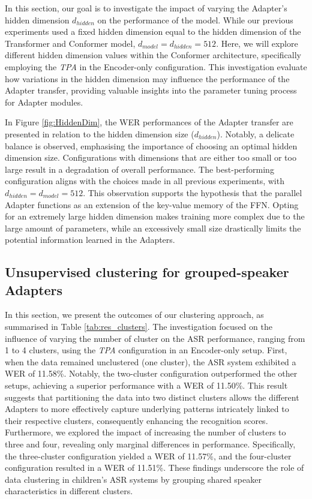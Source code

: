 In this section, our goal is to investigate the impact of varying the Adapter's hidden dimension $d_{hidden}$ on the performance of the model. While our previous experiments used a fixed hidden dimension equal to the hidden dimension of the Transformer and Conformer model, $d_{model} =  d_{hidden} = 512$. Here, we will explore different hidden dimension values within the Conformer architecture, specifically employing the \textit{\ac{TPA}} in the Encoder-only configuration. This investigation evaluate how variations in the hidden dimension may influence the performance of the Adapter transfer, providing valuable insights into the parameter tuning process for Adapter modules.

In Figure \ref{fig:HiddenDim}, the \ac{WER} performances of the Adapter transfer are presented in relation to the hidden dimension size ($d_{hidden}$). Notably, a delicate balance is observed, emphasising the importance of choosing an optimal hidden dimension size. Configurations with dimensions that are either too small or too large result in a degradation of overall performance. The best-performing configuration aligns with the choices made in all previous experiments, with $d_{hidden} = d_{model} = 512$. This observation supports the hypothesis that the parallel Adapter functions as an extension of the key-value memory of the \ac{FFN}. Opting for an extremely large hidden dimension makes training more complex due to the large amount of parameters, while an excessively small size drastically limits the potential information learned in the Adapters. 

\subsection{Unsupervised clustering for grouped-speaker Adapters}

In this section, we present the outcomes of our clustering approach, as summarised in Table \ref{tab:res_clusters}. The investigation focused on the influence of varying the number of cluster on the \ac{ASR} performance, ranging from 1 to 4 clusters, using the \textit{\ac{TPA}} configuration in an Encoder-only setup. First, when the data remained unclustered (one cluster), the \ac{ASR} system exhibited a 
\ac{WER} of 11.58\%. Notably, the two-cluster configuration outperformed the other setups, achieving a superior performance with a \ac{WER} of 11.50\%. This result suggests that partitioning the data into two distinct clusters allows the different Adapters to more effectively capture underlying patterns intricately linked to their respective clusters, consequently enhancing the recognition scores.
Furthermore, we explored the impact of increasing the number of clusters to three and four, revealing only marginal differences in performance. Specifically, the three-cluster configuration yielded a \ac{WER} of 11.57\%, and the four-cluster configuration resulted in a \ac{WER} of 11.51\%. These findings underscore the role of data clustering in children's \ac{ASR} systems by grouping shared speaker characteristics in different clusters.

